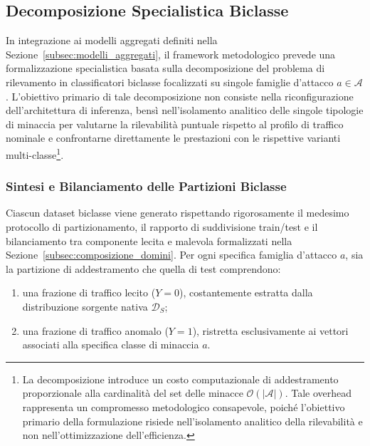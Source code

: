 \subsection{Decomposizione Specialistica Biclasse}
\label{subsec:modelli_biclasse}

In integrazione ai modelli aggregati definiti nella Sezione~\ref{subsec:modelli_aggregati}, il framework metodologico prevede una formalizzazione specialistica basata sulla decomposizione del problema di rilevamento in classificatori biclasse focalizzati su singole famiglie d'attacco $a \in \mathcal{A}$. L'obiettivo primario di tale decomposizione non consiste nella riconfigurazione dell'architettura di inferenza, bensì nell'isolamento analitico delle singole tipologie di minaccia per valutarne la rilevabilità puntuale rispetto al profilo di traffico nominale e confrontarne direttamente le prestazioni con le rispettive varianti multi-classe\footnote{La decomposizione introduce un costo computazionale di addestramento proporzionale alla cardinalità del set delle minacce $\mathcal{O}(|\mathcal{A}|)$. Tale overhead rappresenta un compromesso metodologico consapevole, poiché l'obiettivo primario della formulazione risiede nell'isolamento analitico della rilevabilità e non nell'ottimizzazione dell'efficienza.}.

\subsubsection{Sintesi e Bilanciamento delle Partizioni Biclasse}
\label{subsubsec:sintesi_biclasse}
Ciascun dataset biclasse viene generato rispettando rigorosamente il medesimo protocollo di partizionamento, il rapporto di suddivisione train/test e il bilanciamento tra componente lecita e malevola formalizzati nella Sezione~\ref{subsec:composizione_domini}. Per ogni specifica famiglia d'attacco $a$, sia la partizione di addestramento che quella di test comprendono:
\begin{enumerate}
    \item una frazione di traffico lecito ($Y = 0$), costantemente estratta dalla distribuzione sorgente nativa $\mathcal{D}_S$;
    \item una frazione di traffico anomalo ($Y = 1$), ristretta esclusivamente ai vettori associati alla specifica classe di minaccia $a$.
\end{enumerate}

